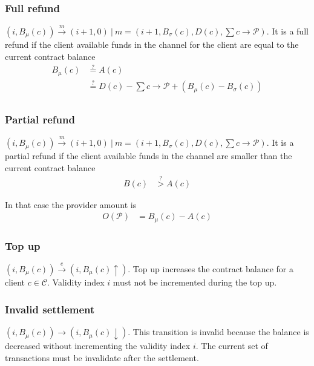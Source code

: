 \documentclass{llncs}
\begin{document}
\subsubsection{Full refund} $(i, B_\mu(c)) \xrightarrow{m} (i+1, 0)\ |\ m = (i+1, B_\sigma(c), D(c), \sum c \rightarrow \mathcal{P})$. It is a full refund if the client available funds in the channel for the client are equal to the current contract balance
\begin{equation*}
\begin{split}
    B_\mu(c) &\overset{?}{=} A(c) \\
    &\overset{?}{=} D(c) - \textstyle \sum c \rightarrow \mathcal{P} + (B_\mu(c) - B_\sigma(c)) \\
\end{split}
\end{equation*}

\subsubsection{Partial refund} $(i, B_\mu(c)) \xrightarrow{m} (i+1, 0)\ |\ m = (i+1, B_\sigma(c), D(c), \sum c \rightarrow \mathcal{P})$. It is a partial refund if the client available funds in the channel are smaller than the current contract balance
\begin{equation*}
\begin{split}
    B(c) &\overset{?}{>} A(c)
\end{split}
\end{equation*}

In that case the provider amount is
\begin{equation*}
\begin{split}
    O(\mathcal{P}) &= B_\mu(c) - A(c)
\end{split}
\end{equation*}

\subsubsection{Top up} $(i, B_\mu(c)) \xrightarrow{e} (i, B_\mu(c)\uparrow)$. Top up increases the contract balance for a client $c \in \mathcal{C}$. Validity index $i$ must not be incremented during the top up.

\subsubsection{Invalid settlement} $(i, B_\mu(c)) \rightarrow (i, B_\mu(c)\downarrow)$. This transition is invalid because the balance is decreased without incrementing the validity index $i$. The current set of transactions must be invalidate after the settlement.
\end{document}
